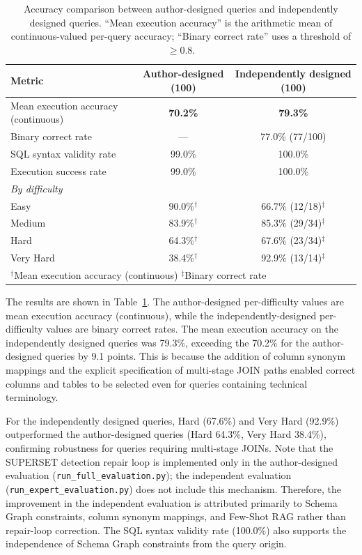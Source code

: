 \documentclass[5p,twocolumn]{elsarticle}
\begin{document}
\begin{table}[htbp]
  \centering
  \caption{Accuracy comparison between author-designed queries and independently designed queries.
  ``Mean execution accuracy'' is the arithmetic mean of continuous-valued per-query accuracy;
  ``Binary correct rate'' uses a threshold of $\geq 0.8$.}
  \label{tab:independent_eval}
  \small
  \begin{tabular}{lcc}
    \toprule
    Metric & Author-designed (100) & Independently designed (100) \\
    \midrule
    Mean execution accuracy (continuous) & \textbf{70.2\%} & \textbf{79.3\%} \\
    Binary correct rate & --- & 77.0\% (77/100) \\
    SQL syntax validity rate & 99.0\% & 100.0\% \\
    Execution success rate & 99.0\% & 100.0\% \\
    \midrule
    \multicolumn{3}{l}{\textit{By difficulty}} \\
    Easy & 90.0\%$^\dagger$ & 66.7\% (12/18)$^\ddagger$ \\
    Medium & 83.9\%$^\dagger$ & 85.3\% (29/34)$^\ddagger$ \\
    Hard & 64.3\%$^\dagger$ & 67.6\% (23/34)$^\ddagger$ \\
    Very Hard & 38.4\%$^\dagger$ & 92.9\% (13/14)$^\ddagger$ \\
    \bottomrule
    \multicolumn{3}{l}{\scriptsize $^\dagger$Mean execution accuracy (continuous) \quad $^\ddagger$Binary correct rate} \\
  \end{tabular}
\end{table}

The results are shown in Table~\ref{tab:independent_eval}.
The author-designed per-difficulty values are mean execution accuracy (continuous),
while the independently-designed per-difficulty values are binary correct rates.
The mean execution accuracy on the independently designed queries was 79.3\%,
exceeding the 70.2\% for the author-designed queries by 9.1 points.
This is because the addition of column synonym mappings and
the explicit specification of multi-stage JOIN paths enabled correct columns and tables to be selected even for queries containing technical terminology.

For the independently designed queries, Hard (67.6\%) and Very Hard (92.9\%)
outperformed the author-designed queries (Hard 64.3\%, Very Hard 38.4\%),
confirming robustness for queries requiring multi-stage JOINs.
Note that the SUPERSET detection repair loop is implemented only in the author-designed evaluation
(\texttt{run\_full\_evaluation.py}); the independent evaluation (\texttt{run\_expert\_evaluation.py})
does not include this mechanism.
Therefore, the improvement in the independent evaluation is attributed primarily to
Schema Graph constraints, column synonym mappings, and Few-Shot RAG rather than repair-loop correction.
The SQL syntax validity rate (100.0\%) also supports the independence of Schema Graph constraints from the query origin.
\end{document}
